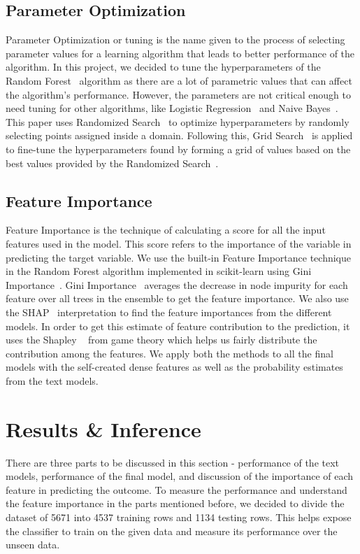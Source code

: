\documentclass[conference]{IEEEtran}
\begin{document}
\subsection{Parameter Optimization} 
Parameter Optimization or tuning is the name given to the process of selecting parameter values for a learning algorithm that leads to better performance of the algorithm. In this project, we decided to tune the hyperparameters of the Random Forest~\cite{rf} algorithm as there are a lot of parametric values that can affect the algorithm's performance. However, the parameters are not critical enough to need tuning for other algorithms, like Logistic Regression~\cite{lr} and Naive Bayes~\cite{nb}. This paper uses Randomized Search~\cite{rand_search} to optimize hyperparameters by randomly selecting points assigned inside a domain. Following this, Grid Search~\cite{rand_search} is applied to fine-tune the hyperparameters found by forming a grid of values based on the best values provided by the Randomized Search~\cite{rand_search}.
\subsection{Feature Importance}
Feature Importance is the technique of calculating a score for all the input features used in the model. This score refers to the importance of the variable in predicting the target variable.
We use the built-in Feature Importance technique in the Random Forest algorithm implemented in scikit-learn using Gini Importance~\cite{gini}. Gini Importance~\cite{gini} averages the decrease in node impurity for each feature over all trees in the ensemble to get the feature importance. We also use the SHAP~\cite{shap} interpretation to find the feature importances from the different models. In order to get this estimate of feature contribution to the prediction, it uses the Shapley ~\cite{shap} from game theory which helps us fairly distribute the contribution among the features. We apply both the methods to all the final models with the self-created dense features as well as the probability estimates from the text models.


\section{Results \& Inference}
There are three parts to be discussed in this section - performance of the text models, performance of the final model, and discussion of the importance of each feature in predicting the outcome. To measure the performance and understand the feature importance in the parts mentioned before, we decided to divide the dataset of 5671 into 4537 training rows and 1134 testing rows. This helps expose the classifier to train on the given data and measure its performance over the unseen data.
\end{document}
